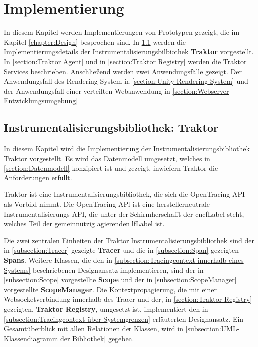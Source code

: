 %
\chapter{Implementierung}
\label{chapter:Implementierung}

In diesem Kapitel werden Implementierungen von Prototypen gezeigt, die im Kapitel \cref{chapter:Design} besprochen sind. In \cref{section:Instrumentalisierungsbibliothek: Traktor} werden die Implementierungsdetails der Instrumentalisierungsbilbiothek \textbf{Traktor} vorgestellt. In \cref{section:Traktor Agent} und in \cref{section:Traktor Registry} werden die Traktor Services beschrieben. Anschließend werden zwei Anwendungsfälle gezeigt. Der Anwendungsfall des Rendering-System in \cref{section:Unity Rendering System} und der Anwendungsfall einer verteilten Webanwendung in \cref{section:Webserver Entwicklungsumgebung}

\section{Instrumentalisierungsbibliothek: Traktor}
\label{section:Instrumentalisierungsbibliothek: Traktor}
In diesem Kapitel wird die Implementierung der Instrumentalisierungsbibliothek Traktor vorgestellt. Es wird das Datenmodell umgesetzt, welches in \cref{section:Datenmodell} konzipiert ist und gezeigt, inwiefern Traktor die Anforderungen erfüllt.

Traktor ist eine Instrumentalisierungsbibliothek, die sich die OpenTracing API als Vorbild nimmt. Die OpenTracing API ist eine herstellerneutrale Instrumentalisierungs-API, die unter der Schirmherschafft der \gls{cncfLabel} steht, welches Teil der gemeinnützig agierenden \gls{lfLabel} ist.

Die zwei zentralen Einheiten der Traktor Instrumentalisierungsbibliothek sind der in \cref{subsection:Tracer} gezeigte \textbf{Tracer} und die in \cref{subsection:Span} gezeigten \textbf{Spans}. Weitere Klassen, die den in \cref{subsection:Tracingcontext innerhalb eines Systems} beschriebenen Designansatz implementieren, sind der in \cref{subsection:Scope} vorgestellte \textbf{Scope} und der in \cref{subsection:ScopeManager} vorgestellte \textbf{ScopeManager}. Die Kontextpropagierung, die mit einer Websocketverbindung innerhalb des Tracer und der, in \cref{section:Traktor Registry} gezeigten,\textbf{ Traktor Registry}, umgesetzt ist, implementiert den in \cref{subsection:Tracingcontext über Systemgrenzen} erläuterten Designansatz. Ein Gesamtüberblick mit allen Relationen der Klassen, wird in \cref{subsection:UML-Klassendiagramm der Bibliothek} gegeben.

